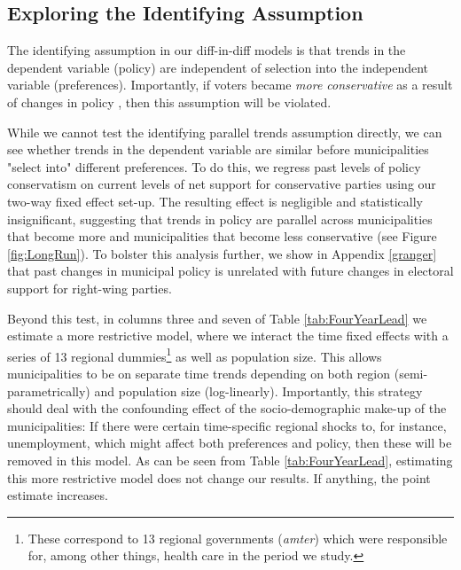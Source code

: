 \documentclass[a4paper,12pt]{article}
\begin{document}
\subsection*{Exploring the Identifying Assumption}
The identifying assumption in our diff-in-diff models is that trends in the dependent variable (policy) are independent of selection into the independent variable (preferences). Importantly, if voters became \emph{more conservative} as a result of changes in policy \cite[cf.][]{lenz2013follow}, then this assumption will be violated.

While we cannot test the identifying parallel trends assumption directly, we can see whether trends in the dependent variable are similar before municipalities "select into" different preferences.  To do this, we regress past levels of policy conservatism on current levels of net support for conservative parties using our two-way fixed effect set-up. The resulting effect is negligible and statistically insignificant, suggesting that trends in policy are parallel across municipalities that become more and municipalities that become less conservative  (see Figure \ref{fig:LongRun}). To  bolster this analysis further,  we show in Appendix \ref{granger} that past changes in municipal policy is unrelated with future changes in electoral support for right-wing parties.


Beyond this test, in columns three and seven of Table \ref{tab:FourYearLead} we estimate a more restrictive model, where we interact the time fixed effects with a series of 13 regional dummies\footnote{These correspond to  13 regional governments (\textit{amter}) which were responsible for, among other things, health care in the period we study.} as well as population size. This allows municipalities to be on separate time trends depending on both region (semi-parametrically) and population size (log-linearly). Importantly, this strategy should deal with the confounding effect of the socio-demographic make-up of the municipalities: If there were certain time-specific regional shocks to, for instance, unemployment, which might affect both preferences and policy, then these will be removed in this model. As can be seen from Table \ref{tab:FourYearLead}, estimating this more restrictive model does not change our results. If anything, the point estimate increases.
\end{document}

